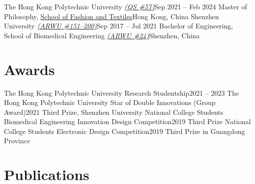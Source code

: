 \documentclass[letterpaper,11pt]{article}
\begin{document}
    \resumeSubHeadingListStart
        \resumeSubheading
            {The Hong Kong Polytechnic University
            \href{https://www.topuniversities.com/world-university-rankings/2025?page=3}{\textsl{(QS \#57)}}}{Sep 2021 -- Feb 2024}
            {Master of Philosophy, \href{https://www.polyu.edu.hk/sft/}{School of Fashion and Textiles}}{Hong Kong, China}
        \resumeSubheading
            {Shenzhen University
            \href{https://www.shanghairanking.com/institution/shenzhen-university}{\textsl{(ARWU \#151--200)}}}{Sep 2017 -- Jul 2021}
            {Bachelor of Engineering, School of Biomedical Engineering
            \href{https://www.shanghairanking.com/rankings/gras/2023/RS0208}{\textsl{(ARWU \#24)}}}{Shenzhen, China}
    \resumeSubHeadingListEnd

    \section{Awards}

    \resumeSubHeadingListStart
        \resumeSubheading
            {The Hong Kong Polytechnic University Research Studentship}{2021 -- 2023}
            {The Hong Kong Polytechnic University}{}
        \resumeSubheading
            {Star of Double Innovations (Group Award)}{2021}
            {Third Prize, Shenzhen University}{}
        \resumeSubheading
            {National College Students Biomedical Engineering Innovation Design Competition}{2019}
            {Third Prize}{}
        \resumeSubheading
            {National College Students Electronic Design Competition}{2019}
            {Third Prize in Guangdong Province}{}
    \resumeSubHeadingListEnd

    \section{Publications}
    
    
\end{document}
